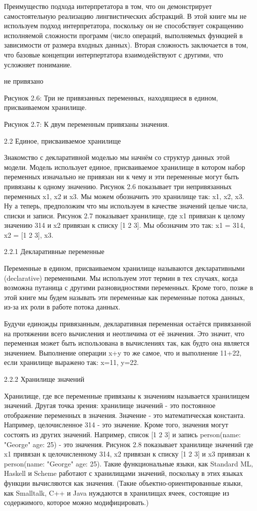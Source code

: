 Преимущество подхода интерпретатора в том, что он демонстрирует самостоятельную реализацию лингвистических абстракций. В этой книге мы не используем подход интерпретатора, поскольку он не способствует сокращению исполняемой сложности программ (число операций, выполняемых функцией в зависимости от размера входных данных). Вторая сложность заключается в том, что базовые концепции интерпертатора взаимодействуют с другими, что усложняет понимание.

не привязано

Рисунок 2.6: Три не привязанных переменных, находящиеся в едином, присваиваемом хранилище.

Рисунок 2.7: К двум переменным привязаны значения.

2.2 Единое, присваиваемое хранилище

Знакомство с декларативной моделью мы начнём со структур данных этой модели. Модель использует единое, присваиваемое хранилище в котором набор переменных изначально не привязан ни к чему и эти переменные могут быть привязаны к одному значению. Рисунок 2.6 показывает три непривязанных переменных x1, x2 и x3. Мы можем обозначить это хранилище так: {x1, x2, x3}. Ну а теперь, предположим что мы используем в качестве значений целые числа, списки и записи. Рисунок 2.7 показывает хранилище, где x1 привязан к целому значению 314 и x2 привязан к списку [1 2 3]. Мы обозначим это так: {x1 = 314, x2 = [1 2 3], x3}.

2.2.1 Декларативные переменные

Переменные в едином, присваиваемом хранилище называются декларативными (declarative) переменными. Мы используем этот термин в тех случаях, когда возможна путаница с другими разновидностями переменных. Кроме того, позже в этой книге мы будем называть эти переменные как переменные потока данных, из-за их роли в работе потока данных.

Будучи единожды привязанным, декларативная переменная остаётся привязанной на протяжении всего вычисления и неотличима от её значения. Это значит, что переменная может быть использована в вычислениях так, как будто она является значением. Выполнение операции x+y то же самое, что и выполнение 11+22, если хранилище выражено так: {x=11, y=22}.

2.2.2 Хранилище значений

Хранилище, где все переменные привязаны к значениям называется хранилищем значений. Другая точка зрения: хранилище значений - это постоянное отображение переменных в значения. Значение - это математическая константа. Например, целочисленное 314 - это значение. Кроме того, значения могут состоять из других значений. Например, список [1 2 3] и запись person(name: "George" age: 25) - это значения. Рисунок 2.8 показывает хранилище значений где x1 привязан к целочисленному 314, x2 привязан к списку [1 2 3] и x3 привязан к person(name: "George" age: 25). Такие функциональные языки, как Standard ML, Haskell и Scheme работают с хранилищами значений, поскольку в этих языках функции вычисляются как значения. (Такие объектно-ориентированные языки, как Smalltalk, C++ и Java нуждаются в хранилищах ячеек, состоящие из содержимого, которое можно модифицировать.)

